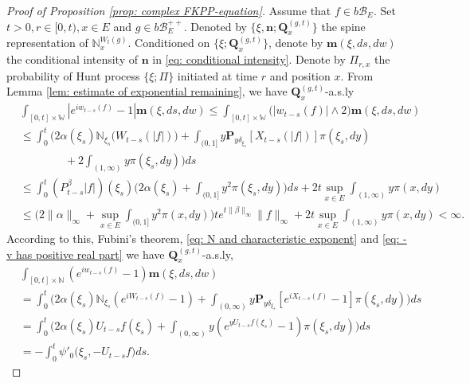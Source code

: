 \documentclass[12pt]{amsart}
\theoremstyle{plain}
\theoremstyle{definition}
\numberwithin{equation}{section}
\begin{document}
\begin{proof}[Proof of Proposition \ref{prop: complex FKPP-equation}]
    Assume that $f\in b\mathscr B_E$.
    Set $t>0, r\in [0,t), x\in E$ and $g\in b\mathscr B_E^{++}$.
    Denoted by $\{\xi, \mathbf n; \mathbf Q_x^{(g,t)}\}$ the spine representation of $\mathbb N_x^{W_t(g)}$.
    Conditioned on $\{\xi; \mathbf Q_x^{(g,t)}\}$, denote by $\mathbf m(\xi, ds,dw)$ the conditional intensity of $\mathbf n$ in \eqref{eq: conditional intensity}.
    Denote by $\Pi_{r,x}$ the probability of Hunt process $\{\xi; \Pi\}$ initiated at time $r$ and position $x$.
    From Lemma \ref{lem: estimate of exponential remaining}, we have $\mathbf Q^{(g,t)}_{x}$-a.s.ly
\begin{align}
&\int_{[0,t]\times \mathbb W}|e^{i w_{t-s}(f)} - 1| \mathbf m(\xi, ds,dw)
    \leq \int_{[0,t]\times \mathbb W}\big(| w_{t-s}(f)| \wedge 2\big) \mathbf m(\xi, ds,dw)
    \\&\leq \int_0^t \Big(2\alpha(\xi_s)\mathbb N_{\xi_s}\big( W_{t-s}(|f|)\big)  + \int_{(0,1]} y \mathbf P_{y \delta_{\xi_s}}[ X_{t-s}(|f|)] \pi(\xi_s,dy)
    \\&\qquad\qquad+ 2\int_{(1,\infty)}y\pi(\xi_s,dy)\Big) ds
     \\&\leq \int_0^t (P_{t-s}^\beta |f|)(\xi_s)\Big(2\alpha(\xi_s)  + \int_{(0,1]} y^2 \pi(\xi_s,dy)\Big) ds + 2t \sup_{x\in E}\int_{(1,\infty)}y\pi(x,dy)
    \\&\leq \Big(2\|\alpha\|_\infty +\sup_{x\in E}\int_{(0,1]} y^2 \pi(x,dy)\Big) t e^{t\|\beta\|_\infty}\|f\|_\infty + 2t \sup_{x\in E}\int_{(1,\infty)}y\pi(x,dy)
    < \infty.
\end{align}
    According to this, Fubini's theorem, \eqref{eq: N and characteristic exponent} and \eqref{eq: -v has positive real part} we have $\mathbf Q^{(g,t)}_{x}$-a.s.ly,
\begin{align}
    &\int_{[0,t]\times \mathbb N}(e^{i w_{t-s}(f)} - 1) \mathbf m(\xi, ds,dw)
    \\&=\int_0^t \Big(2\alpha(\xi_s)\mathbb N_{\xi_s}(e^{i W_{t-s}(f)} - 1)  + \int_{(0,\infty)} y \mathbf P_{y \delta_{\xi_s}}[e^{i X_{t-s}(f)} - 1] \pi(\xi_s,dy)\Big) ds
    \\&=\int_0^t \Big( 2\alpha(\xi_s) U_{t-s} f(\xi_s) + \int_{(0,\infty)} y (e^{y U_{t-s}f(\xi_s)} - 1) \pi(\xi_s,dy) \Big) ds
    \\&= -\int_0^t \psi'_0 \big(\xi_s, -U_{t-s}f\big)ds.
\end{align}

\end{proof}
\end{document}

